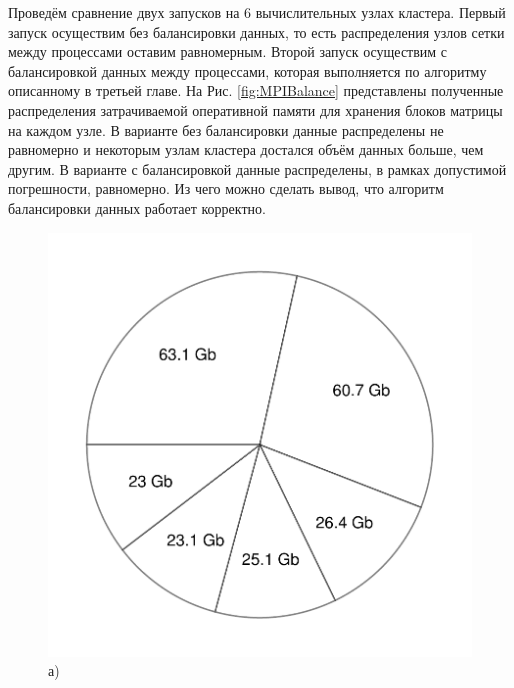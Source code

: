 Проведём сравнение двух запусков на 6 вычислительных узлах кластера. Первый запуск осуществим без балансировки данных, то есть распределения узлов сетки между процессами оставим равномерным. Второй запуск осуществим с балансировкой данных между процессами, которая выполняется по алгоритму описанному в третьей главе. На Рис. \ref{fig:MPIBalance} представлены полученные распределения затрачиваемой оперативной памяти для хранения блоков матрицы на каждом узле. В варианте без балансировки данные распределены не равномерно и некоторым узлам кластера достался объём данных больше, чем другим. В варианте с балансировкой данные распределены, в рамках допустимой погрешности, равномерно. Из чего можно сделать вывод, что алгоритм балансировки данных работает корректно.

\begin{figure}[ht]
    \begin{minipage}[b][][b]{0.49\linewidth}\centering
        \includegraphics[width=\linewidth]{pics/PieChartNoBalance.pdf} \\ а)
    \end{minipage}
    \hfill
    \begin{minipage}[b][][b]{0.49\linewidth}\centering

\end{minipage}
\end{figure}
